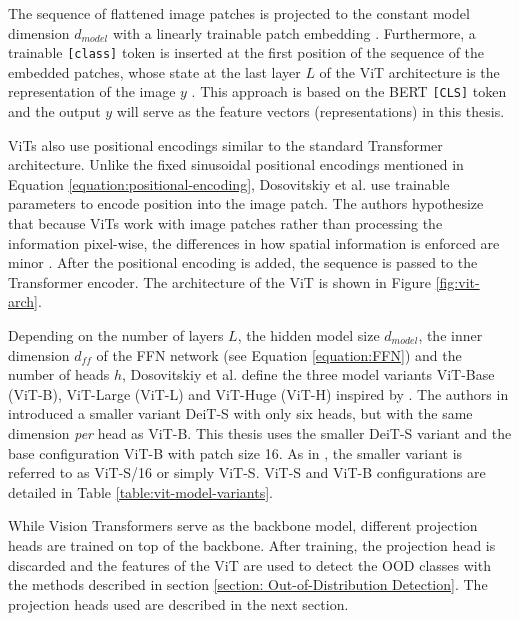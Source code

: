 The sequence of flattened image patches is projected to the constant model dimension $d_{model}$ with a linearly trainable patch embedding \citep{Dosovitskiy2020,Vaswani2017}.
Furthermore, a trainable \texttt{[class]} token is inserted at the first position of the sequence of the embedded patches, whose state at the last layer $L$ of the ViT architecture is the representation of the image $y$ \citep{Dosovitskiy2020}.
This approach is based on the BERT \texttt{[CLS]} token \citep{Devlin2018} and the output $y$ will serve as the feature vectors (representations) in this thesis.
\par
ViTs also use positional encodings similar to the standard Transformer architecture.
Unlike the fixed sinusoidal positional encodings mentioned in Equation \ref{equation:positional-encoding}, Dosovitskiy et al. \citep{Dosovitskiy2020} use trainable parameters to encode position into the image patch.
The authors hypothesize that because ViTs work with image patches rather than processing the information pixel-wise, the differences in how spatial information is enforced are minor \citep{Dosovitskiy2020}.
After the positional encoding is added, the sequence is passed to the Transformer encoder.
The architecture of the ViT is shown in Figure \ref{fig:vit-arch}.
\par
Depending on the number of layers $L$, the hidden model size $d_{model}$, the inner dimension $d_{ff}$ of the FFN network (see Equation \ref{equation:FFN}) and the number of heads $h$, Dosovitskiy et al. \citep{Dosovitskiy2020} define the three model variants ViT-Base (ViT-B), ViT-Large (ViT-L) and ViT-Huge (ViT-H) inspired by \citep{Devlin2018}.
The authors in \citep{Touvron2020} introduced a smaller variant DeiT-S with only six heads, but with the same dimension \textit{per} head as ViT-B.
This thesis uses the smaller DeiT-S variant \citep{Touvron2020} and the base configuration ViT-B with patch size 16.
As in \citep{Caron2021}, the smaller variant is referred to as ViT-S/16 or simply ViT-S.
ViT-S and ViT-B configurations are detailed in Table \ref{table:vit-model-variants}.
\par
While Vision Transformers serve as the backbone model, different projection heads are trained on top of the backbone. 
After training, the projection head is discarded and the features of the ViT are used to detect the OOD classes with the methods described in section \ref{section: Out-of-Distribution Detection}.
The projection heads used are described in the next section.
